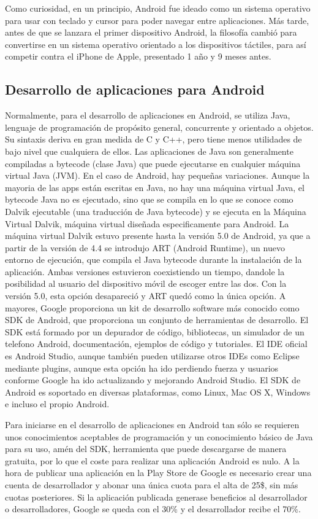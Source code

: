 \documentclass[
10pt, %
a4paper, %
oneside, %
headinclude,footinclude, %
BCOR5mm, %
]{scrartcl}
\begin{document}
Como curiosidad, en un principio, Android fue ideado como un sistema operativo para usar con teclado y cursor para poder navegar entre aplicaciones. Más tarde, antes de que se lanzara el primer dispositivo Android, la filosofía cambió para convertirse en un sistema operativo orientado a los dispositivos táctiles, para así competir contra el iPhone de Apple, presentado 1 año y 9 meses antes.

\subsection{Desarrollo de aplicaciones para Android}
Normalmente, para el desarrollo de aplicaciones en Android, se utiliza Java, lenguaje de programación de propósito general, concurrente y orientado a objetos. Su sintaxis deriva en gran medida de C y C++, pero tiene menos utilidades de bajo nivel que cualquiera de ellos. Las aplicaciones de Java son generalmente compiladas a bytecode (clase Java) que puede ejecutarse en cualquier máquina virtual Java (JVM). En el caso de Android, hay pequeñas variaciones. Aunque la mayoria de las apps están escritas en Java, no hay una máquina virtual Java, el bytecode Java no es ejecutado, sino que se compila en lo que se conoce como Dalvik ejecutable (una traducción de Java bytecode) y se ejecuta en la Máquina Virtual Dalvik, máquina virtual diseñada especificamente para Android. La máquina virtual Dalvik estuvo presente hasta la versión 5.0 de Android, ya que a partir de la versión de 4.4 se introdujo ART (Android Runtime), un nuevo entorno de ejecución, que compila el Java bytecode durante la instalación de la aplicación. Ambas versiones estuvieron coexistiendo un tiempo, dandole la posibilidad al usuario del dispositivo móvil de escoger entre las dos. Con la versión 5.0, esta opción desapareció y ART quedó como la única opción. A mayores, Google proporciona un kit de desarrollo software más conocido como SDK de Android, que proporciona un conjunto de herramientas de desarrollo. El SDK está formado por un depurador de código, bibliotecas, un simulador de un telefono Android, documentación, ejemplos de código y tutoriales. El IDE oficial es Android Studio, aunque también pueden utilizarse otros IDEs como Eclipse mediante plugins, aunque esta opción ha ido perdiendo fuerza y usuarios conforme Google ha ido actualizando y mejorando Android Studio. El SDK de Android es soportado en diversas plataformas, como Linux, Mac OS X, Windows e incluso el propio Android.

Para iniciarse en el desarrollo de aplicaciones en Android tan sólo se requieren unos conocimientos aceptables de programación y un conocimiento básico de Java para su uso, amén del SDK, herramienta que puede descargarse de manera gratuita, por lo que el coste para realizar una aplicación Android es nulo. A la hora de publicar una aplicación en la Play Store de Google es necesario crear una cuenta de desarrollador y abonar una única cuota para el alta de 25\$, sin más cuotas posteriores. Si la aplicación publicada generase beneficios al desarrollador o desarrolladores, Google se queda con el 30\% y el desarrollador recibe el 70\%.
\end{document}
